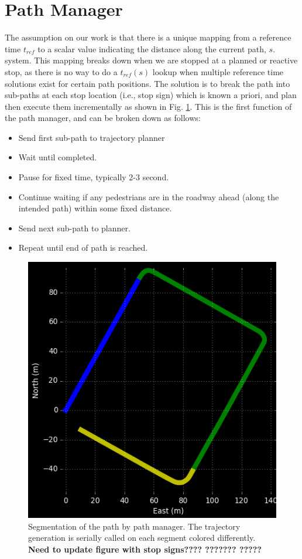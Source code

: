 \documentclass[letterpaper, 10 pt, conference]{ieeeconf}  %
\begin{document}

\section{Path Manager} \label{sec:pathmanager}


The assumption on our work is that there is a unique mapping from a reference time $t_{ref}$ to a scalar value indicating the distance along the current path, $s$.
system.
This mapping breaks down when we are stopped at a planned or reactive stop, as there is no way to do a $t_{ref}(s)$ lookup when multiple reference time solutions exist for certain path positions.
The solution is to break the path into sub-paths at each stop location (i.e., stop sign) which is known a priori, and plan then execute them incrementally as shown in Fig. \ref{fig:segmentation}.
This is the first function of the path manager, and can be broken down as follows:
\begin{itemize}
\item Send first sub-path to trajectory planner
\item Wait until completed.
\item Pause for fixed time, typically 2-3 second.
\item Continue waiting if any pedestrians are in the roadway ahead (along the intended path) within some fixed distance.
\item Send next sub-path to planner.
\item Repeat until end of path is reached.
\end{itemize}

\begin{figure}[thpb]
  \centering
  \includegraphics[width=0.5\columnwidth]{graphics/Subpaths.png}
  \caption{
    Segmentation of the path by path manager.
    The trajectory generation is serially called on each segment colored differently.
    \textbf{Need to update figure with stop signs???? ??????? ?????}
  }
  \label{fig:segmentation}
\end{figure}
\end{document}
